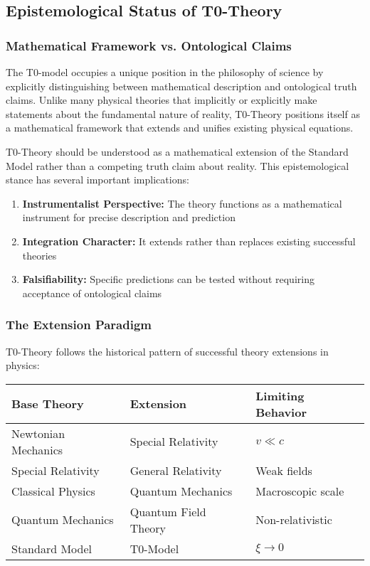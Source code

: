 \documentclass[12pt,a4paper]{article}
\theoremstyle{definition}
\begin{document}
	\subsection{Epistemological Status of T0-Theory}
	
	\subsubsection{Mathematical Framework vs. Ontological Claims}
	
	The T0-model occupies a unique position in the philosophy of science by explicitly distinguishing between mathematical description and ontological truth claims. Unlike many physical theories that implicitly or explicitly make statements about the fundamental nature of reality, T0-Theory positions itself as a mathematical framework that extends and unifies existing physical equations.
	
	\begin{philosophy}
		T0-Theory should be understood as a mathematical extension of the Standard Model rather than a competing truth claim about reality. This epistemological stance has several important implications:
		
		\begin{enumerate}
			\item \textbf{Instrumentalist Perspective:} The theory functions as a mathematical instrument for precise description and prediction
			\item \textbf{Integration Character:} It extends rather than replaces existing successful theories
			\item \textbf{Falsifiability:} Specific predictions can be tested without requiring acceptance of ontological claims
		\end{enumerate}
	\end{philosophy}
	
	\subsubsection{The Extension Paradigm}
	
	T0-Theory follows the historical pattern of successful theory extensions in physics:
	
	\begin{center}
		\begin{tabular}{lll}
			\toprule
			\textbf{Base Theory} & \textbf{Extension} & \textbf{Limiting Behavior} \\
			\midrule
			Newtonian Mechanics & Special Relativity & $v \ll c$ \\
			Special Relativity & General Relativity & Weak fields \\
			Classical Physics & Quantum Mechanics & Macroscopic scale \\
			Quantum Mechanics & Quantum Field Theory & Non-relativistic \\
			Standard Model & T0-Model & $\xi \to 0$ \\
			\bottomrule
		\end{tabular}
	\end{center}
	
\end{document}
